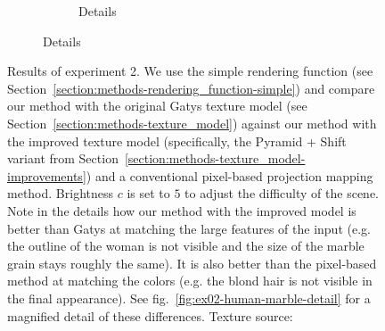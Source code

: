 \begin{figure}[]
\begin{subfigure}{\textwidth}
\begin{subfigure}{0.78\textwidth}
\begin{subfigure}{0.32\textwidth}
                \begin{subfigure}{\textwidth}
                    \centering
                \end{subfigure}
            \end{subfigure}
            \caption*{Details}
        \end{subfigure}
    \end{subfigure}
    \caption{Results of experiment 2. We use the simple rendering function (see Section~\ref{section:methods-rendering_function-simple}) and compare our method with the original Gatys texture model (see Section~\ref{section:methods-texture_model}) against our method with the improved texture model (specifically, the Pyramid + Shift variant from Section~\ref{section:methods-texture_model-improvements}) and a conventional pixel-based projection mapping method. Brightness \(c\) is set to \(5\) to adjust the difficulty of the scene. Note in the details how our method with the improved model is better than Gatys at matching the large features of the input (e.g. the outline of the woman is not visible and the size of the marble grain stays roughly the same). It is also better than the pixel-based method at matching the colors (e.g. the blond hair is not visible in the final appearance). See fig.~\ref{fig:ex02-human-marble-detail} for a magnified detail of these differences. Texture source: \citet{Pixar128}}
    \label{fig:ex02-human-marble}
\end{figure}

